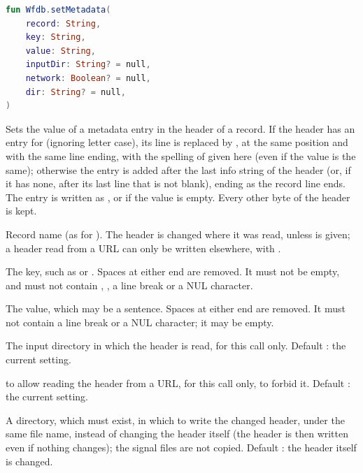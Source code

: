 \begin{lstlisting}[language=Kotlin,style=signature]
fun Wfdb.setMetadata(
    record: String,
    key: String,
    value: String,
    inputDir: String? = null,
    network: Boolean? = null,
    dir: String? = null,
)
\end{lstlisting}
Sets the value of a metadata entry in the header of a record. If the header has an entry
for  (ignoring letter case), its line is replaced by , at
the same position and with the same line ending, with the spelling of  given
here (even if the value is the same); otherwise the entry is added after the last info
string of the header (or, if it has none, after its last line that is not blank), ending
as the record line ends. The entry is written as , or 
if the value is empty. Every other byte of the header is kept.
\begin{params}
\item[record] Record name (as for ). The header is changed where it was
  read, unless  is given; a header read from a URL can only be written
  elsewhere, with .
\item[key] The key, such as  or . Spaces at either end
  are removed. It must not be empty, and must not contain \code{:}, \code{\#}, a line
  break or a NUL character.
\item[value] The value, which may be a sentence. Spaces at either end are removed. It
  must not contain a line break or a NUL character; it may be empty.
\item[inputDir] The input directory in which the header is read, for this call only.
  Default : the current setting.
\item[network]  to allow reading the header from a URL, for this call only,
   to forbid it. Default : the current setting.
\item[dir] A directory, which must exist, in which to write the changed header, under the
  same file name, instead of changing the header itself (the header is then written even
  if nothing changes); the signal files are not copied. Default : the header
  itself is changed.
\end{params}
